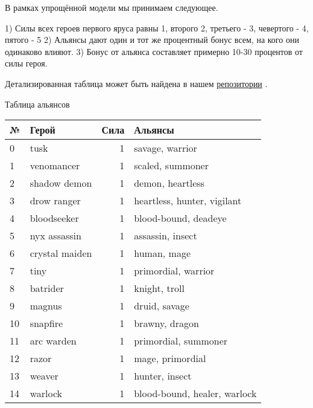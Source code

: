 \documentclass{article}
\begin{document}
В рамках упрощённой модели мы принимаем следующее.

1) Силы всех героев первого яруса равны 1, второго 2, третьего - 3, чевертого - 4, пятого - 5
2) Альянсы дают один и тот же процентный бонус всем, на кого они одинаково влияют.
3) Бонус от альянса составляет примерно 10-30 процентов от силы героя.

Детализированная таблица может быть найдена в нашем \href{https://github.com/aponom84/UnderLords/blob/master/UnderLordsData.xlsx}{репозитории} \cite{UnderLoardsInput}.

Таблица альянсов \\

\begin{table}
\center
\resizebox{!}{10cm} {
\begin{tabular}{llrl}
\label{aliances}
{№} &                 Герой &  Сила &                       Альянсы \\
\midrule
0  &                 tusk &      1 &               savage, warrior  \\
1  &           venomancer &      1 &               scaled, summoner \\
2  &         shadow demon &      1 &               demon, heartless \\
3  &          drow ranger &      1 &    heartless, hunter, vigilant \\
4  &          bloodseeker &      1 &           blood-bound, deadeye \\
5  &         nyx assassin &      1 &               assassin, insect \\
6  &       crystal maiden &      1 &                    human, mage \\
7  &                 tiny &      1 &           primordial, warrior  \\
8  &             batrider &      1 &                  knight, troll \\
9  &               magnus &      1 &                  druid, savage \\
10 &             snapfire &      1 &                 brawny, dragon \\
11 &           arc warden &      1 &           primordial, summoner \\
12 &                razor &      1 &               mage, primordial \\
13 &               weaver &      1 &                 hunter, insect \\
14 &              warlock &      1 &  blood-bound, healer, warlock  \\

\end{tabular}}
\end{table}
\end{document}
